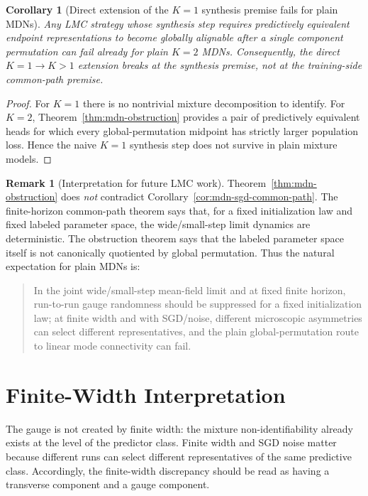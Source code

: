 \documentclass[11pt]{article}
\newtheorem{corollary}[theorem]{Corollary}
\theoremstyle{definition}
\newtheorem{remark}[theorem]{Remark}
\begin{document}
\begin{corollary}[Direct extension of the $K=1$ synthesis premise fails for plain MDNs]
\label{cor:k1-breaks-at-k2}
Any LMC strategy whose synthesis step requires predictively equivalent endpoint
representations to become globally alignable after a single component
permutation can fail already for plain $K=2$ MDNs. Consequently, the direct
$K=1\to K>1$ extension breaks at the synthesis premise, not at the training-side
common-path premise.
\end{corollary}

\begin{proof}
For $K=1$ there is no nontrivial mixture decomposition to identify. For $K=2$,
Theorem~\ref{thm:mdn-obstruction} provides a pair of predictively equivalent
heads for which every global-permutation midpoint has strictly larger
population loss. Hence the naive $K=1$ synthesis step does not survive in plain
mixture models.
\end{proof}

\begin{remark}[Interpretation for future LMC work]
Theorem~\ref{thm:mdn-obstruction} does \emph{not} contradict
Corollary~\ref{cor:mdn-sgd-common-path}. The finite-horizon common-path theorem
says that, for a fixed initialization law and fixed labeled parameter space, the
wide/small-step limit dynamics are deterministic. The obstruction theorem says
that the labeled parameter space itself is not canonically quotiented by global
permutation. Thus the natural expectation for plain MDNs is:
\begin{quote}
In the joint wide/small-step mean-field limit and at fixed finite horizon,
run-to-run gauge randomness should be suppressed for a fixed initialization law;
at finite width and with SGD/noise, different microscopic asymmetries can
select different representatives, and the plain global-permutation route to
linear mode connectivity can fail.
\end{quote}
\end{remark}

\section{Finite-Width Interpretation}

The gauge is not created by finite width: the mixture non-identifiability
already exists at the level of the predictor class. Finite width and SGD noise
matter because different runs can select different representatives of the same
predictive class. Accordingly, the finite-width discrepancy should be read as
having a transverse component and a gauge component.
\end{document}
